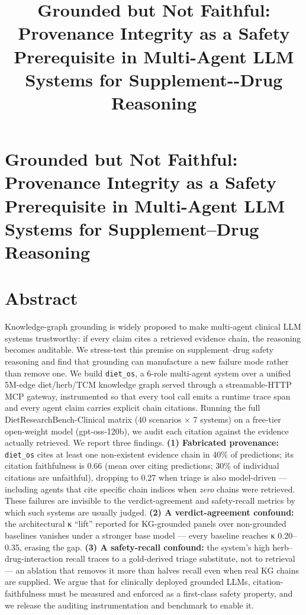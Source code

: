 \documentclass[
]{article}
\title{Grounded but Not Faithful: Provenance Integrity as a Safety
Prerequisite in Multi-Agent LLM Systems for Supplement-\/-Drug
Reasoning}
\author{}
\date{}
\begin{document}
\maketitle

\hypertarget{grounded-but-not-faithful-provenance-integrity-as-a-safety-prerequisite-in-multi-agent-llm-systems-for-supplementdrug-reasoning}{%
\section{Grounded but Not Faithful: Provenance Integrity as a Safety
Prerequisite in Multi-Agent LLM Systems for Supplement--Drug
Reasoning}\label{grounded-but-not-faithful-provenance-integrity-as-a-safety-prerequisite-in-multi-agent-llm-systems-for-supplementdrug-reasoning}}

\hypertarget{abstract}{%
\section{Abstract}\label{abstract}}

Knowledge-graph grounding is widely proposed to make multi-agent
clinical LLM systems trustworthy: if every claim cites a retrieved
evidence chain, the reasoning becomes auditable. We stress-test this
premise on supplement--drug safety reasoning and find that grounding can
manufacture a new failure mode rather than remove one. We build
\texttt{diet\_os}, a 6-role multi-agent system over a unified 5M-edge
diet/herb/TCM knowledge graph served through a streamable-HTTP MCP
gateway, instrumented so that every tool call emits a runtime trace span
and every agent claim carries explicit chain citations. Running the full
DietResearchBench-Clinical matrix (40 scenarios × 7 systems) on a
free-tier open-weight model (gpt-oss-120b), we audit each citation
against the evidence actually retrieved. We report three findings.
\textbf{(1) Fabricated provenance:} \texttt{diet\_os} cites at least one
non-existent evidence chain in 40\% of predictions; its citation
faithfulness is 0.66 (mean over citing predictions; 30\% of individual
citations are unfaithful), dropping to 0.27 when triage is also
model-driven --- including agents that cite specific chain indices when
\emph{zero} chains were retrieved. These failures are invisible to the
verdict-agreement and safety-recall metrics by which such systems are
usually judged. \textbf{(2) A verdict-agreement confound:} the
architectural κ ``lift'' reported for KG-grounded panels over
non-grounded baselines vanishes under a stronger base model --- every
baseline reaches κ 0.20--0.35, erasing the gap. \textbf{(3) A
safety-recall confound:} the system's high herb--drug-interaction recall
traces to a gold-derived triage substitute, not to retrieval --- an
ablation that removes it more than halves recall even when real KG
chains are supplied. We argue that for clinically deployed grounded
LLMs, citation-faithfulness must be measured and enforced as a
first-class safety property, and we release the auditing instrumentation
and benchmark to enable it.
\end{document}
